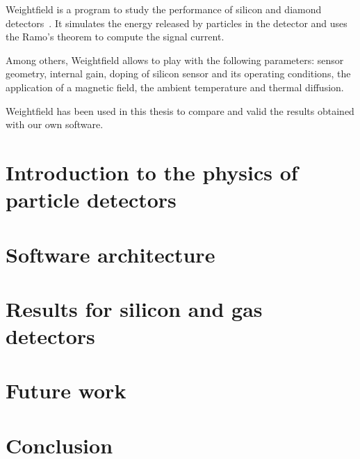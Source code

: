 \documentclass[11pt]{article}
\begin{document}
Weightfield is a program to study the performance of silicon and diamond
detectors~\cite{Cenna2015}. It simulates the energy released by particles in the detector
and uses the Ramo's theorem to compute the signal current.

Among others, Weightfield allows to play with the following parameters:
sensor geometry, internal gain, doping of silicon sensor and its operating
conditions, the application of a magnetic field, the ambient temperature and
thermal diffusion.

Weightfield has been used in this thesis to compare and valid the results
obtained with our own software.

\section{Introduction to the physics of particle detectors}

\section{Software architecture}

\section{Results for silicon and gas detectors}

\section{Future work}

\section{Conclusion}

\newpage



\end{document}
